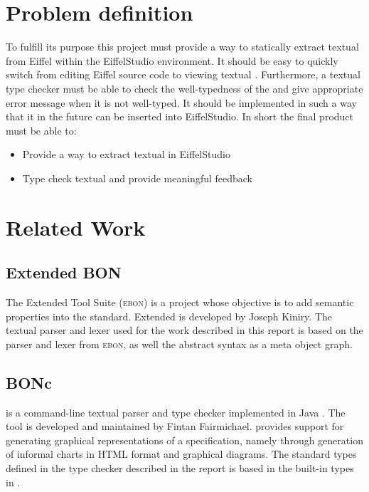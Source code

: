 \section{Problem definition}
To fulfill its purpose this project must provide a way to statically extract textual \bon{ } from Eiffel within the EiffelStudio environment. It should be easy to quickly switch from editing Eiffel source code to viewing textual \bon. Furthermore, a textual \bon{ } type checker must be able to check the well-typedness of the \bon{ } and give appropriate error message when it is not well-typed. It should be implemented in such a way that it in the future can be inserted into EiffelStudio. \newline\newline In short the final product must be able to:
\begin{itemize}
 
  \item Provide a way to extract textual \bon{ } in EiffelStudio
  \item Type check textual \bon{ } and provide meaningful feedback
 
\end{itemize}

\section{Related Work}

\subsection{Extended BON}
The Extended \bon{} Tool Suite (\textsc{ebon}) is a project whose objective is to add semantic properties into the \bon{} standard. Extended \bon{} is developed by Joseph Kiniry. The textual \bon{} parser and lexer used for the work described in this report is based on the parser and lexer from \textsc{ebon}, as well the abstract syntax as a meta object graph.

\subsection{BONc}
 is a command-line textual \bon{} parser and type checker implemented in Java \cite{bonc}. The tool is developed and maintained by Fintan Fairmichael.  provides support for generating graphical representations of a \bon{} specification, namely through generation of informal charts in HTML format and graphical \bon{} diagrams. The standard types defined in the type checker described in the report is based in the built-in types in .

